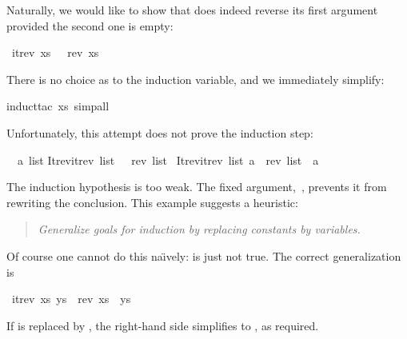 \begin{isabellebody}
\begin{isamarkuptext}
Naturally, we would like to show that  does indeed reverse
its first argument provided the second one is empty:%
\end{isamarkuptext}%
\isamarkuptrue%
\isamarkupfalse%
\ {\isachardoublequoteopen}itrev\ xs\ {\isacharbrackleft}{\isacharbrackright}\ {\isacharequal}\ rev\ xs{\isachardoublequoteclose}%
\isadelimproof
%
\endisadelimproof
%
\isatagproof
%
\begin{isamarkuptxt}%
\noindent
There is no choice as to the induction variable, and we immediately simplify:%
\end{isamarkuptxt}%
\isamarkuptrue%
\isamarkupfalse%
{\isacharparenleft}induct{\isacharunderscore}tac\ xs{\isacharcomma}\ simp{\isacharunderscore}all{\isacharparenright}%
\begin{isamarkuptxt}%
\noindent
Unfortunately, this attempt does not prove
the induction step:
\begin{isabelle}%
\ {}{\isachardot}\ {\isasymAnd}a\ list{\isachardot}\isanewline
{}Itrev{\isachardot}itrev\ list\ {\isacharbrackleft}{\isacharbrackright}\ {\isacharequal}\ rev\ list\ {\isasymLongrightarrow}\isanewline
{}Itrev{\isachardot}itrev\ list\ {\isacharbrackleft}a{\isacharbrackright}\ {\isacharequal}\ rev\ list\ {\isacharat}\ {\isacharbrackleft}a{\isacharbrackright}%
\end{isabelle}
The induction hypothesis is too weak.  The fixed
argument,~\isa{{\isacharbrackleft}{\isacharbrackright}}, prevents it from rewriting the conclusion.  
This example suggests a heuristic:
\begin{quote}%
\emph{Generalize goals for induction by replacing constants by variables.}
\end{quote}
Of course one cannot do this na\"{\i}vely:  is
just not true.  The correct generalization is%
\end{isamarkuptxt}%
\isamarkuptrue%
%
\endisatagproof
{\isafoldproof}%
%
\isadelimproof
%
\endisadelimproof
{}\isamarkupfalse%
\ {\isachardoublequoteopen}itrev\ xs\ ys\ {\isacharequal}\ rev\ xs\ {\isacharat}\ ys{\isachardoublequoteclose}%
\isadelimproof
%
\endisadelimproof
%
\isatagproof
%
\begin{isamarkuptxt}%
\noindent
If  is replaced by \isa{{\isacharbrackleft}{\isacharbrackright}}, the right-hand side simplifies to
, as required.


\end{isamarkuptxt}
\end{isabellebody}
